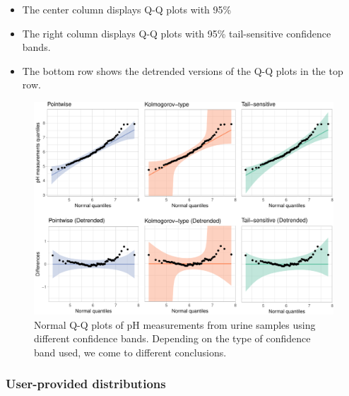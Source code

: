 \begin{itemize}
\item
  The center column displays Q-Q plots with 95\%
\item
  The right column displays Q-Q plots with 95\% tail-sensitive
   confidence bands.
\item
  The bottom row shows the detrended versions of the Q-Q plots in the
  top row.
\end{itemize}

\begin{Schunk}
\begin{figure}

{\centering \includegraphics[width=\textwidth]{loy-figures/urine-qq-bands-1} 

}

\caption[Normal Q-Q plots of pH measurements from urine samples using different confidence bands]{Normal Q-Q plots of pH measurements from urine samples using different confidence bands. Depending on the type of confidence band used, we come to different conclusions.}\label{fig:urine-qq-bands}
\end{figure}
\end{Schunk}

\FloatBarrier

\subsubsection{User-provided
distributions}\label{user-provided-distributions}

